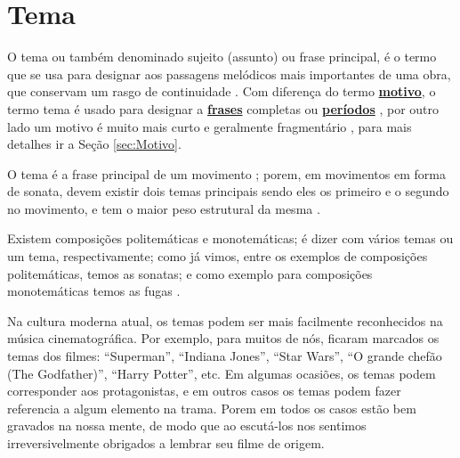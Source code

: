 \section{Tema}
\label{sec:tema}

O tema ou também denominado sujeito (assunto) ou frase principal,
é o termo que se usa para designar aos passagens melódicos mais importantes de uma obra, 
que conservam um rasgo de continuidade \cite[pp. 411]{stainer2009dictionary} \cite[pp. 1496]{latham2008diccionario}.
Com diferença do termo \hyperref[sec:Motivo]{\textbf{motivo}},
o termo tema é usado para designar a \hyperref[sec:Frase]{\textbf{frases}} completas 
ou \hyperref[sec:Periodo]{\textbf{períodos}} \cite[pp. 1496]{latham2008diccionario},
por outro lado um motivo é muito mais curto e geralmente fragmentário \cite[pp. 545]{apel1969harvard},
para mais detalhes ir a Seção \ref{sec:Motivo}.

O tema é a frase principal de um movimento \cite[pp. 411]{stainer2009dictionary};
porem,  em movimentos em forma de sonata, 
devem existir  dois  temas principais sendo eles os primeiro e o segundo no movimento, e
tem o maior peso estrutural da mesma \cite[pp. 411]{stainer2009dictionary} \cite[pp. 1496]{latham2008diccionario}.

Existem composições politemáticas e monotemáticas;
é dizer com vários temas ou um tema, respectivamente; 
como já vimos, entre os exemplos de composições politemáticas,
temos as sonatas; e como exemplo para composições monotemáticas temos as fugas \cite[pp. 539]{apel1969harvard}.

\begin{example}
Na cultura moderna atual, os temas podem ser mais facilmente reconhecidos  na música cinematográfica.
Por exemplo, para muitos de nós, ficaram marcados os temas dos filmes: ``Superman'', ``Indiana Jones'',
``Star Wars'', ``O grande chefão (The Godfather)'', ``Harry Potter'', etc.
Em algumas ocasiões, os temas podem corresponder aos protagonistas, 
e em outros casos os temas podem fazer referencia a algum elemento na trama.
Porem em todos os casos estão bem gravados na nossa mente, 
de modo que ao escutá-los nos sentimos irreversivelmente obrigados a lembrar seu filme de origem.
\end{example}
